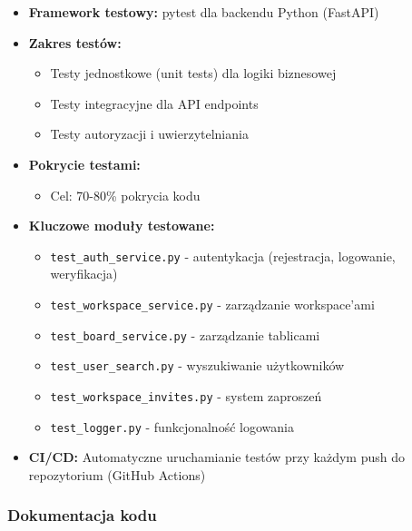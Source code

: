 \documentclass[12pt,a4paper]{article}
\begin{document}
\begin{itemize}[leftmargin=*]
    \item \textbf{Framework testowy:} pytest dla backendu Python (FastAPI)
    \item \textbf{Zakres testów:}
    \begin{itemize}
        \item Testy jednostkowe (unit tests) dla logiki biznesowej
        \item Testy integracyjne dla API endpoints
        \item Testy autoryzacji i uwierzytelniania
    \end{itemize}
    \item \textbf{Pokrycie testami:} 
    \begin{itemize}
        \item Cel: 70-80\% pokrycia kodu
        
    \end{itemize}
    \item \textbf{Kluczowe moduły testowane:}
    \begin{itemize}
        \item \texttt{test\_auth\_service.py} - autentykacja (rejestracja, logowanie, weryfikacja)
        \item \texttt{test\_workspace\_service.py} - zarządzanie workspace'ami
        \item \texttt{test\_board\_service.py} - zarządzanie tablicami
        \item \texttt{test\_user\_search.py} - wyszukiwanie użytkowników
        \item \texttt{test\_workspace\_invites.py} - system zaproszeń
        \item \texttt{test\_logger.py} - funkcjonalność logowania
    \end{itemize}
    \item \textbf{CI/CD:} Automatyczne uruchamianie testów przy każdym push do repozytorium (GitHub Actions)
\end{itemize}

\subsubsection{Dokumentacja kodu}
\end{document}
